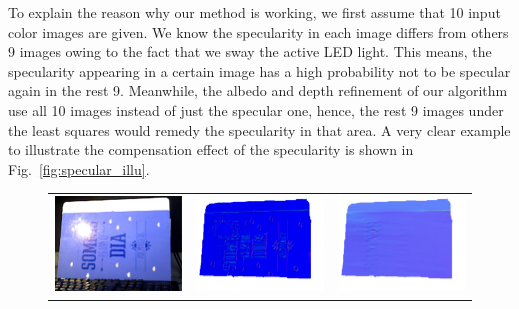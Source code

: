 To explain the reason why our method is working, we first assume that 10 input color images are given.
We know the specularity in each image differs from others 9 images owing to the fact that we sway the active LED light.
This means, the specularity appearing in a certain image has a high probability not to be specular again in the rest 9.
Meanwhile, the albedo and depth refinement of our algorithm use all 10 images instead of just the specular one,
hence, the rest 9 images under the least squares would remedy the specularity in that area.
A very clear example to illustrate the compensation effect of the specularity is shown in Fig.~\ref{fig:specular_illu}.
\begin{figure}[!ht]
\centering
\setlength{\tabcolsep}{0.1em} %
 {\renewcommand{\arraystretch}{1.6}%
\begin{tabular}{c|c c}
   \includegraphics[height = 0.24\linewidth]{figures/result/robust_folder_rgb.pdf} 
   &
   \includegraphics[height = 0.24\linewidth]{figures/result/rgbd_folder_normal.pdf} &
   \includegraphics[height = 0.24\linewidth]{figures/result/robust_folder_normal.pdf} \\


\end{tabular}}
\end{figure}

